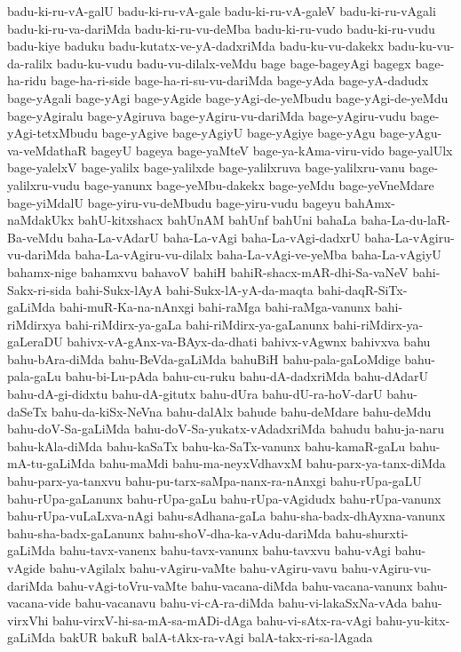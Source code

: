 {badu-ki-ru-vA-galU
badu-ki-ru-vA-gale
badu-ki-ru-vA-galeV
badu-ki-ru-vAgali
badu-ki-ru-va-dariMda
badu-ki-ru-vu-deMba
badu-ki-ru-vudo
badu-ki-ru-vudu
badu-kiye
baduku
badu-kutatx-ve-yA-dadxriMda
badu-ku-vu-dakekx
badu-ku-vu-da-ralilx
badu-ku-vudu
badu-vu-dilalx-veMdu
bage
bage-bageyAgi
bagegx
bage-ha-ridu
bage-ha-ri-side
bage-ha-ri-su-vu-dariMda
bage-yAda
bage-yA-dadudx
bage-yAgali
bage-yAgi
bage-yAgide
bage-yAgi-de-yeMbudu
bage-yAgi-de-yeMdu
bage-yAgiralu
bage-yAgiruva
bage-yAgiru-vu-dariMda
bage-yAgiru-vudu
bage-yAgi-tetxMbudu
bage-yAgive
bage-yAgiyU
bage-yAgiye
bage-yAgu
bage-yAgu-va-veMdathaR
bageyU
bageya
bage-yaMteV
bage-ya-kAma-viru-vido
bage-yalUlx
bage-yalelxV
bage-yalilx
bage-yalilxde
bage-yalilxruva
bage-yalilxru-vanu
bage-yalilxru-vudu
bage-yanunx
bage-yeMbu-dakekx
bage-yeMdu
bage-yeVneMdare
bage-yiMdalU
bage-yiru-vu-deMbudu
bage-yiru-vudu
bageyu
bahAmx-naMdakUkx
bahU-kitxshacx
bahUnAM
bahUnf
bahUni
bahaLa
baha-La-du-laR-Ba-veMdu
baha-La-vAdarU
baha-La-vAgi
baha-La-vAgi-dadxrU
baha-La-vAgiru-vu-dariMda
baha-La-vAgiru-vu-dilalx
baha-La-vAgi-ve-yeMba
baha-La-vAgiyU
bahamx-nige
bahamxvu
bahavoV
bahiH
bahiR-shacx-mAR-dhi-Sa-vaNeV
bahi-Sakx-ri-sida
bahi-Sukx-lAyA
bahi-Sukx-lA-yA-da-maqta
bahi-daqR-SiTx-gaLiMda
bahi-muR-Ka-na-nAnxgi
bahi-raMga
bahi-raMga-vanunx
bahi-riMdirxya
bahi-riMdirx-ya-gaLa
bahi-riMdirx-ya-gaLanunx
bahi-riMdirx-ya-gaLeraDU
bahivx-vA-gAnx-va-BAyx-da-dhati
bahivx-vAgwnx
bahivxva
bahu
bahu-bAra-diMda
bahu-BeVda-gaLiMda
bahuBiH
bahu-pala-gaLoMdige
bahu-pala-gaLu
bahu-bi-Lu-pAda
bahu-cu-ruku
bahu-dA-dadxriMda
bahu-dAdarU
bahu-dA-gi-didxtu
bahu-dA-gitutx
bahu-dUra
bahu-dU-ra-hoV-darU
bahu-daSeTx
bahu-da-kiSx-NeVna
bahu-dalAlx
bahude
bahu-deMdare
bahu-deMdu
bahu-doV-Sa-gaLiMda
bahu-doV-Sa-yukatx-vAdadxriMda
bahudu
bahu-ja-naru
bahu-kAla-diMda
bahu-kaSaTx
bahu-ka-SaTx-vanunx
bahu-kamaR-gaLu
bahu-mA-tu-gaLiMda
bahu-maMdi
bahu-ma-neyxVdhavxM
bahu-parx-ya-tanx-diMda
bahu-parx-ya-tanxvu
bahu-pu-tarx-saMpa-nanx-ra-nAnxgi
bahu-rUpa-gaLU
bahu-rUpa-gaLanunx
bahu-rUpa-gaLu
bahu-rUpa-vAgidudx
bahu-rUpa-vanunx
bahu-rUpa-vuLaLxva-nAgi
bahu-sAdhana-gaLa
bahu-sha-badx-dhAyxna-vanunx
bahu-sha-badx-gaLanunx
bahu-shoV-dha-ka-vAdu-dariMda
bahu-shurxti-gaLiMda
bahu-tavx-vanenx
bahu-tavx-vanunx
bahu-tavxvu
bahu-vAgi
bahu-vAgide
bahu-vAgilalx
bahu-vAgiru-vaMte
bahu-vAgiru-vavu
bahu-vAgiru-vu-dariMda
bahu-vAgi-toVru-vaMte
bahu-vacana-diMda
bahu-vacana-vanunx
bahu-vacana-vide
bahu-vacanavu
bahu-vi-cA-ra-diMda
bahu-vi-lakaSxNa-vAda
bahu-virxVhi
bahu-virxV-hi-sa-mA-sa-mADi-dAga
bahu-vi-sAtx-ra-vAgi
bahu-yu-kitx-gaLiMda
bakUR
bakuR
balA-tAkx-ra-vAgi
balA-takx-ri-sa-lAgada
}
